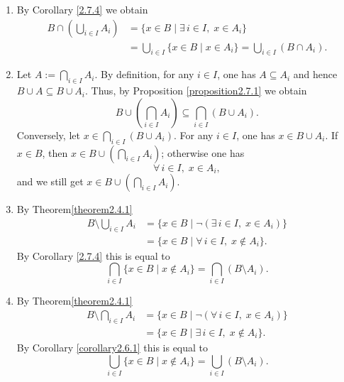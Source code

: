 \begin{proofenv}
\begin{enumerate}
    \item By Corollary \ref{2.7.4} we obtain
    \begin{align*}
    B \cap \left( \bigcup_{i \in I} A_i \right) &= \{x \in B \mid \exists\,  i \in I, \; x \in A_i\} \\
    &= \bigcup_{i \in I} \{x \in B \mid x \in A_i\} = \bigcup_{i \in I} (B \cap A_i).
    \end{align*}
    \item Let \( A := \bigcap_{i \in I} A_i \). By definition,  for any \( i \in I \),  one has \( A \subseteq A_i \) and hence \( B \cup A \subseteq B \cup A_i \). Thus,  by Proposition \ref{proposition2.7.1} we obtain
    \[
    B \cup \left( \bigcap_{i \in I} A_i \right) \subseteq \bigcap_{i \in I} (B \cup A_i).
    \]
    Conversely,  let \( x \in \bigcap_{i \in I} (B \cup A_i) \). For any \( i \in I \),  one has \( x \in B \cup A_i \). If \( x \in B \),  then \( x \in B \cup \left( \bigcap_{i \in I} A_i \right) \); otherwise one has
    \[
    \forall\,  i \in I, \; x \in A_i, 
    \]
    and we still get \( x \in B \cup \left( \bigcap_{i \in I} A_i \right) \).

    \item By Theorem\ref{theorem2.4.1}
    \begin{align*}
    B \setminus \bigcup_{i \in I} A_i &= \{x \in B \mid \neg (\exists\,  i \in I, \; x \in A_i) \} \\
    &= \{x \in B \mid \forall\,  i \in I, \; x \notin A_i \}.
    \end{align*}
    By Corollary \ref{2.7.4} this is equal to
    \[
    \bigcap_{i \in I} \{x \in B \mid x \notin A_i\} = \bigcap_{i \in I} (B \setminus A_i).
    \]

    \item By Theorem\ref{theorem2.4.1}
    \begin{align*}
    B \setminus \bigcap_{i \in I} A_i &= \{x \in B \mid \neg (\forall\,  i \in I, \; x \in A_i) \} \\
    &= \{x \in B \mid \exists\,  i \in I, \; x \notin A_i \}.
    \end{align*}
    By Corollary \ref{corollary2.6.1} this is equal to
    \[
    \bigcup_{i \in I} \{x \in B \mid x \notin A_i\} = \bigcup_{i \in I} (B \setminus A_i).
    \]
\end{enumerate}
\end{proofenv}

